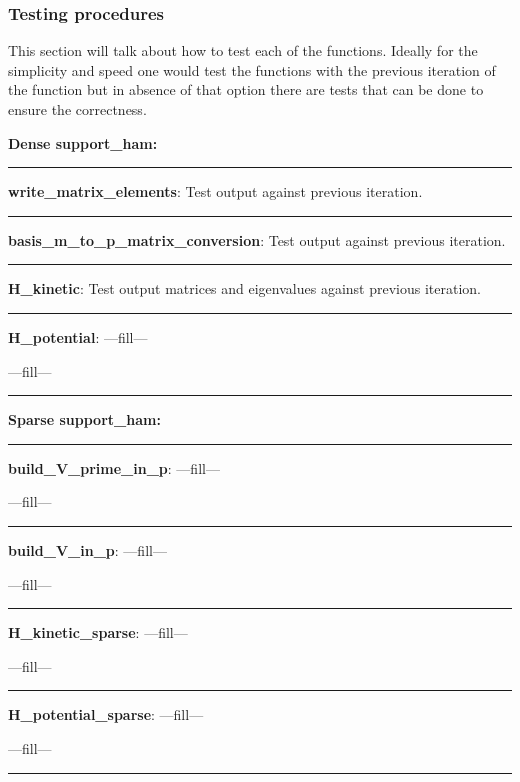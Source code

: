 \documentclass[a4paper,10pt]{article}
\begin{document}
\subsubsection{Testing procedures}

This section will talk about how to test each of the functions. Ideally for the simplicity and speed one would test the functions with the previous iteration of the function but in absence of that option there are tests that can be done to ensure the correctness.


\textbf{\newline Dense support\_ham:}

\noindent\rule{\linewidth}{0.4pt}

\textbf{write\_matrix\_elements}: Test output against previous iteration.

\noindent\rule{\linewidth}{0.4pt}

\textbf{basis\_m\_to\_p\_matrix\_conversion}: Test output against previous iteration.

\noindent\rule{\linewidth}{0.4pt}

\textbf{H\_kinetic}: Test output matrices and eigenvalues against previous iteration.

\noindent\rule{\linewidth}{0.4pt}

\textbf{H\_potential}: ---fill---

---fill---

\noindent\rule{\linewidth}{0.4pt}


\textbf{\newline Sparse support\_ham:}

\noindent\rule{\linewidth}{0.4pt}

\textbf{build\_V\_prime\_in\_p}: ---fill---

---fill---

\noindent\rule{\linewidth}{0.4pt}


\textbf{build\_V\_in\_p}: ---fill---

---fill---

\noindent\rule{\linewidth}{0.4pt}

\textbf{H\_kinetic\_sparse}: ---fill---

---fill---

\noindent\rule{\linewidth}{0.4pt}

\textbf{H\_potential\_sparse}: ---fill---

---fill---

\noindent\rule{\linewidth}{0.4pt}
\end{document}
